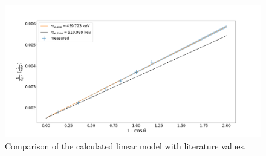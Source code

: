 \begin{figure}
	\centering
	\includegraphics[width=1.0\textwidth]{./fig/energy-shift.png}
	\caption{Comparison of the calculated linear model with literature values.}
	\label{fig:energy-shift}
\end{figure}
